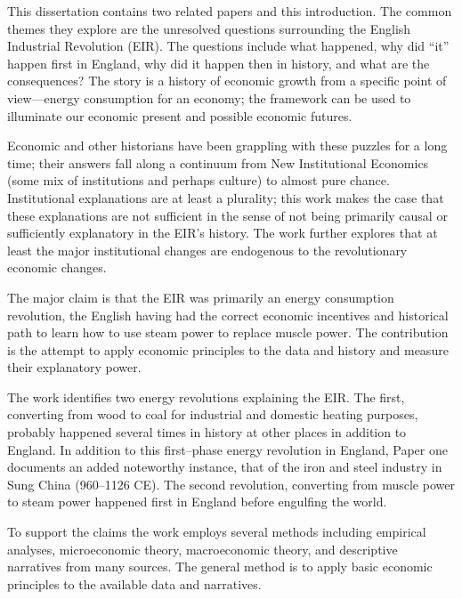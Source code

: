 
\setcounter{page}{4}


	This dissertation contains two related papers and this introduction. The common themes they explore are the unresolved questions surrounding the English Industrial Revolution (EIR). The questions include what happened, why did ``it'' happen first in England, why did it happen then in history, and what are the consequences? The story is a history of economic growth from a specific point of view---energy consumption for an economy; the framework can be used to illuminate our economic present and possible economic futures.

	Economic and other historians have been grappling with these puzzles for a long time; their answers fall along a continuum from New Institutional Economics (some mix of institutions and perhaps culture) to almost pure chance. Institutional explanations are at least a plurality; this work makes the case that these explanations are not sufficient in the sense of not being primarily causal or sufficiently explanatory in the EIR's history. The work further explores that at least the major institutional changes are endogenous to the revolutionary economic changes.

	The major claim is that the EIR was primarily an energy consumption revolution, the English having had the correct economic incentives and historical path to learn how to use steam power to replace muscle power. The contribution is the attempt to apply economic principles to the data and history and measure their explanatory power.

	The work identifies two energy revolutions explaining the EIR. The first, converting from wood to coal for industrial and domestic heating purposes, probably happened several times in history at other places in addition to England. In addition to this first--phase energy revolution in England, Paper one documents an added noteworthy instance, that of the iron and steel industry in Sung China (960--1126 CE). The second revolution, converting from muscle power to steam power happened first in England before engulfing the world.

	To support the claims the work employs several methods including empirical analyses, microeconomic theory, macroeconomic theory, and descriptive narratives from many sources. The general method is to apply basic economic principles to the available data and narratives.

